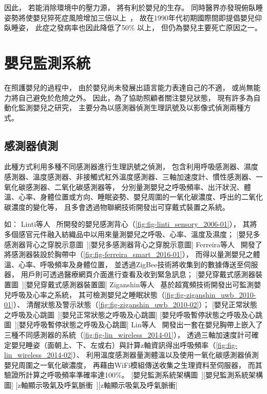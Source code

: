 \documentclass[class=NCU_thesis, crop=false]{standalone}
\begin{document}
因此，
若能消除環境中的壓力源，
將有利於嬰兒的生存。
同時醫界亦發現俯臥睡姿勢將使嬰兒猝死症風險增加三倍以上~\cite{willinger_infant_1994}，
故在1990年代初期國際間即提倡嬰兒仰臥睡姿，
此症之發病率也因此降低了50\% 以上，
但仍為嬰兒主要死亡原因之一。

\section{嬰兒監測系統}
在照護嬰兒的過程中，
由於嬰兒尚未發展出語言能力表達自己的不適，
或尚無能力將自己避免於危險之外。
因此，為了協助照顧者關注嬰兒狀態，
現有許多為自動化監測嬰兒之研究，
主要分為以感測器偵測生理訊號及以影像式偵測兩種方式。

\subsection{感測器偵測}
此種方式利用多種不同感測器進行生理訊號之偵測，
包含利用呼吸感測器、濕度感測器、溫度感測器、非接觸式紅外溫度感測器、三軸加速度計、慣性感測器、一氧化碳感測器、二氧化碳感測器等，
分別量測嬰兒之呼吸頻率、出汗狀況、體溫、心率、身體位置或方向、睡眠姿勢、嬰兒周圍的一氧化碳濃度、呼出的二氧化碳濃度的變化等，
且多會透過物聯網技術開發出可穿戴式裝置之系統。

如：
Linti等人~\cite{linti_sensory_2006}
所開發的嬰兒感測背心（\cref{fig:fig-linti_sensory_2006-01}），
其將多個感官元件融入紡織品中以用來量測嬰兒之呼吸、心率、溫度及濕度；
[嬰兒多感測器背心之穿脫示意圖~\cite{linti_sensory_2006}][嬰兒多感測器背心之穿脫示意圖]
Ferreira等人~\cite{ferreira_smart_2016}
開發了將感測器裝設於胸帶中（\cref{fig:fig-ferreira_smart_2016-01}），
而得以量測嬰兒之體溫、心率、呼吸頻率及身體位置，
並透過ZigBee技術將收集到的數據傳送至伺服器，
用戶則可透過醫療網頁介面進行查看及收到緊急訊息；
[嬰兒穿戴式感測器裝置圖~\cite{ferreira_smart_2016}][嬰兒穿戴式感測器裝置圖]
Ziganshin等人~\cite{ziganshin_uwb_2010}
基於超寬頻技術開發出可監測嬰兒呼吸及心率之系統，
其可檢測嬰兒之睡眠狀態（\cref{fig:fig-ziganshin_uwb_2010-01}）、
清醒狀態及警示狀態（\cref{fig:fig-ziganshin_uwb_2010-02}）；
[嬰兒正常狀態之呼吸及心跳圖~\cite{ziganshin_uwb_2010}][嬰兒正常狀態之呼吸及心跳圖]
[嬰兒呼吸暫停狀態之呼吸及心跳圖~\cite{ziganshin_uwb_2010}][嬰兒呼吸暫停狀態之呼吸及心跳圖]
Lin等人~\cite{lin_wireless_2014}
開發出一套在嬰兒胸帶上嵌入了三種不同感測器的系統（\cref{fig:fig-lin_wireless_2014-01}），
透過三軸加速度計可確定嬰兒睡姿（面朝上、下、左或右）與計算z軸資訊得出呼吸頻率（\cref{fig:fig-lin_wireless_2014-02}）、
利用溫度感測器量測體溫以及使用一氧化碳感測器偵測嬰兒周圍之一氧化碳濃度，
再藉由WiFi模組傳送收集之生理資料至伺服器，
而其驗證所計算之呼吸頻率準確率達100\%。
[嬰兒監測系統架構圖~\cite{lin_wireless_2014}][嬰兒監測系統架構圖]
[z軸顯示吸氣及呼氣脈衝~\cite{lin_wireless_2014}][z軸顯示吸氣及呼氣脈衝]
\end{document}
